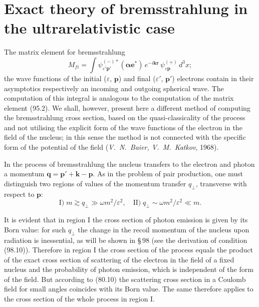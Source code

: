 
\section{Exact theory of bremsstrahlung in the ultrarelativistic case}


The matrix element for bremsstrahlung
\begin{equation}
M_{fi} = \int\psi_{\varepsilon'\mathbf{p}'}^{(-)*}(\boldsymbol{\alpha}\mathbf{e}^*)\,e^{-i\mathbf{k}\mathbf{r}}\,\psi_{\varepsilon\mathbf{p}}^{(+)}\,d^3x;
\label{eq:96.1}
\end{equation}
the wave functions of the initial ($\varepsilon$, $\mathbf{p}$) and final ($\varepsilon'$, $\mathbf{p}'$) electrons contain in their asymptotics respectively an incoming and outgoing spherical wave. The computation of this integral is analogous to the computation of the matrix element (95.2). We shall, however, present here a different method of computing the bremsstrahlung cross section, based on the quasi-classicality of the process and not utilising the explicit form of the wave functions of the electron in the field of the nucleus; in this sense the method is not connected with the specific form of the potential of the field (\emph{V.~N.~Baier, V.~M.~Katkov}, 1968).

In the process of bremsstrahlung the nucleus transfers to the electron and photon a momentum $\mathbf{q} = \mathbf{p}' + \mathbf{k} - \mathbf{p}$. As in the problem of pair production, one must distinguish two regions of values of the momentum transfer $q_\perp$, transverse with respect to $\mathbf{p}$:
\begin{equation}
\text{I)}\; m \gtrsim q_\perp \gg \omega m^2/\varepsilon^2, \quad \text{II)}\; q_\perp \sim \omega m^2/\varepsilon^2 \ll m.
\label{eq:96.2}
\end{equation}

It is evident that in region I the cross section of photon emission is given by its Born value: for such $q_\perp$ the change in the recoil momentum of the nucleus upon radiation is inessential, as will be shown in \S\,98 (see the derivation of condition (98.10)). Therefore in region I the cross section of the process equals the product of the exact cross section of scattering of the electron in the field of a fixed nucleus and the probability of photon emission, which is independent of the form of the field. But according to (80.10) the scattering cross section in a Coulomb field for small angles coincides with its Born value. The same therefore applies to the cross section of the whole process in region I.

